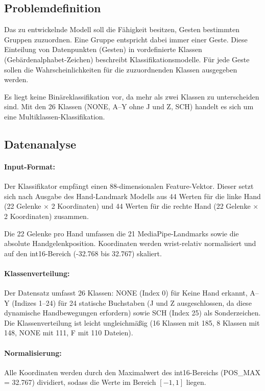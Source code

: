 \subsection{Problemdefinition}

Das zu entwickelnde Modell soll die Fähigkeit besitzen, Gesten bestimmten Gruppen zuzuordnen. Eine Gruppe entspricht dabei immer einer Geste. Diese Einteilung von Datenpunkten (Gesten) in vordefinierte Klassen (Gebärdenalphabet-Zeichen) beschreibt Klassifikationsmodelle. Für jede Geste sollen die Wahrscheinlichkeiten für die zuzuordnenden Klassen ausgegeben werden.

Es liegt keine Binäreklassifikation vor, da mehr als zwei Klassen zu unterscheiden sind. Mit den 26 Klassen (NONE, A–Y ohne J und Z, SCH) handelt es sich um eine Multiklassen-Klassifikation.

\subsection{Datenanalyse}

\paragraph{Input-Format:} Der Klassifikator empfängt einen 88-dimensionalen Feature-Vektor. Dieser setzt sich nach Ausgabe des Hand-Landmark Modells aus 44 Werten für die linke Hand (22 Gelenke $\times$ 2 Koordinaten) und 44 Werten für die rechte Hand (22 Gelenke $\times$ 2 Koordinaten) zusammen.

Die 22 Gelenke pro Hand umfassen die 21 MediaPipe-Landmarks sowie die absolute Handgelenkposition. Koordinaten werden wrist-relativ normalisiert und auf den int16-Bereich ({-}32.768 bis 32.767) skaliert.

\paragraph{Klassenverteilung:} Der Datensatz umfasst 26 Klassen: NONE (Index 0) für Keine Hand erkannt, A--Y (Indizes 1--24) für 24 statische Buchstaben (J und Z ausgeschlossen, da diese dynamische Handbewegungen erfordern) sowie SCH (Index 25) als Sonderzeichen. Die Klassenverteilung ist leicht ungleichmäßig (16 Klassen mit 185, 8 Klassen mit 148, NONE mit 111, F mit 110 Dateien).

\paragraph{Normalisierung:} Alle Koordinaten werden durch den Maximalwert des int16-Bereichs (POS\_MAX = 32.767) dividiert, sodass die Werte im Bereich \([{-}1, 1]\) liegen.

